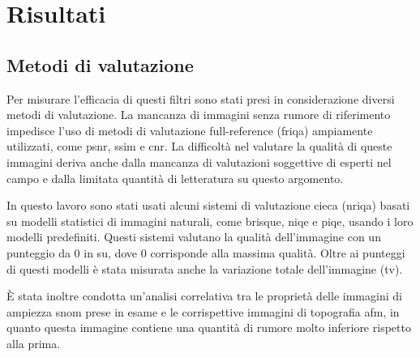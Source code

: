 \documentclass[../main.tex]{subfiles}
\begin{document}
\chapter{Risultati}

\section{Metodi di valutazione}

Per misurare l'efficacia di questi filtri sono stati presi in considerazione diversi metodi di valutazione. La mancanza di immagini senza rumore di riferimento impedisce l'uso di metodi di valutazione full-reference (\acrshort{friqa}) ampiamente utilizzati, come \acrshort{psnr}\cite{korhonen_2012}, \acrshort{ssim}\cite{wang_2004} e \acrshort{cnr}.\cite{rodriguez_2018} La difficoltà nel valutare la qualità di queste immagini deriva anche dalla mancanza di valutazioni soggettive di esperti nel campo e dalla limitata quantità di letteratura su questo argomento.

In questo lavoro sono stati usati alcuni sistemi di valutazione cieca (\acrshort{nriqa}) basati su modelli statistici di immagini naturali, come \acrshort{brisque}\cite{mittal_2011}, \acrshort{niqe}\cite{mittal_2013} e \acrshort{piqe}\cite{venkatanath_2015}, usando i loro modelli predefiniti. Questi sistemi valutano la qualità dell'immagine con un punteggio da 0 in su, dove 0 corrisponde alla massima qualità. Oltre ai punteggi di questi modelli è stata misurata anche la variazione totale dell'immagine (\acrshort{tv}).

È stata inoltre condotta un'analisi correlativa tra le proprietà delle immagini di ampiezza \acrshort{snom} prese in esame e le corrispettive immagini di topografia \acrshort{afm}, in quanto questa immagine contiene una quantità di rumore molto inferiore rispetto alla prima.
\end{document}

